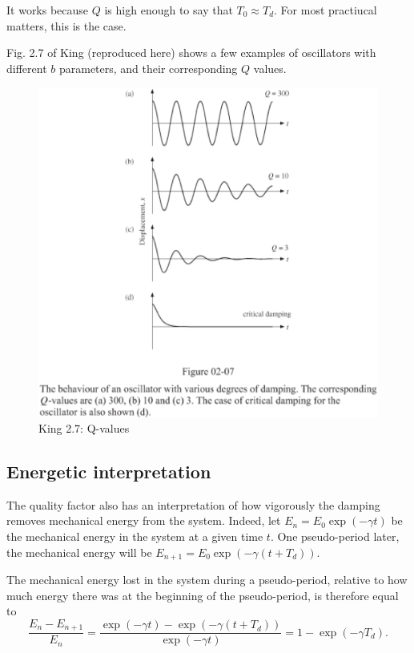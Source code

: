 \documentclass[11pt]{article}
\makeatletter
\def\maxwidth{\ifdim\Gin@nat@width>\linewidth\linewidth
    \else\Gin@nat@width\fi}
\let\Oldincludegraphics\includegraphics
\renewcommand{\includegraphics}[1]{\Oldincludegraphics[width=.8\maxwidth]{#1}}
\makeatother
\begin{document}
It works because \(Q\) is high enough to say that \(T_0 \approx T_d\).
For most practiucal matters, this is the case.

    Fig. 2.7 of King (reproduced here) shows a few examples of oscillators
with different \(b\) parameters, and their corresponding \(Q\) values.

\begin{figure}
\centering
\includegraphics{Q-valuz.png}
\caption{King 2.7: Q-values}
\end{figure}

    \hypertarget{energetic-interpretation}{%
\subsection{Energetic interpretation}\label{energetic-interpretation}}

The quality factor also has an interpretation of how vigorously the
damping removes mechanical energy from the system. Indeed, let
\(E_n = E_0\exp(-\gamma t)\) be the mechanical energy in the system at a
given time \(t\). One pseudo-period later, the mechanical energy will be
\(E_{n+1} = E_0\exp(-\gamma(t+T_d))\).

    The mechanical energy lost in the system during a pseudo-period,
relative to how much energy there was at the beginning of the
pseudo-period, is therefore equal to
\[ \frac{E_{n} - E_{n+1}}{E_n} = \frac{\exp(-\gamma t) - \exp(-\gamma(t+T_d))}{\exp(-\gamma t)} = 1 - \exp(-\gamma T_d).\]
\end{document}

